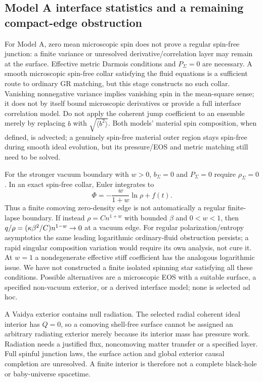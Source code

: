 \subsection{Model A interface statistics and a remaining compact-edge obstruction}
For Model A, zero mean microscopic spin does not prove a regular spin-free junction: a finite variance or unresolved derivative/correlation layer may remain at the surface. Effective metric Darmois conditions and $P_\Sigma=0$ are necessary. A smooth microscopic spin-free collar satisfying the fluid equations is a sufficient route to ordinary GR matching, but this stage constructs no such collar. Vanishing nonnegative variance implies vanishing spin in the mean-square sense; it does not by itself bound microscopic derivatives or provide a full interface correlation model. Do not apply the coherent jump coefficient to an ensemble merely by replacing $b$ with $\sqrt{\langle b^2\rangle}$. Both models' material spin composition, when defined, is advected; a genuinely spin-free material outer region stays spin-free during smooth ideal evolution, but its pressure/EOS and metric matching still need to be solved.

For the stronger vacuum boundary with $w>0$, $b_\Sigma=0$ and $P_\Sigma=0$ require $\rho_\Sigma=0$. In an exact spin-free collar, Euler integrates to
\begin{equation}
 \Phi=-\frac{w}{1+w}\ln\rho+f(t).
\end{equation}
Thus a finite comoving zero-density edge is not automatically a regular finite-lapse boundary. If instead $\rho=Cn^{1+w}$ with bounded $\beta$ and $0<w<1$, then $q/\rho=(\kappa\beta^2/C)n^{1-w}\to0$ at a vacuum edge. For regular polarization/entropy asymptotics the same leading logarithmic ordinary-fluid obstruction persists; a rapid singular composition variation would require its own analysis, not cure it. At $w=1$ a nondegenerate effective stiff coefficient has the analogous logarithmic issue. We have not constructed a finite isolated spinning star satisfying all these conditions. Possible alternatives are a microscopic EOS with a suitable surface, a specified non-vacuum exterior, or a derived interface model; none is selected ad hoc.

A Vaidya exterior contains null radiation. The selected radial coherent ideal interior has $Q=0$, so a comoving shell-free surface cannot be assigned an arbitrary radiating exterior merely because its interior mass has pressure work. Radiation needs a justified flux, noncomoving matter transfer or a specified layer. Full spinful junction laws, the surface action and global exterior causal completion are unresolved. A finite interior is therefore not a complete black-hole or baby-universe spacetime.
